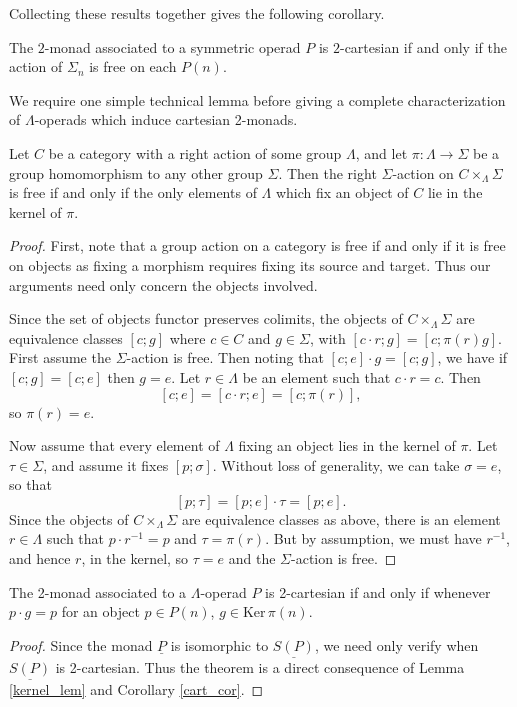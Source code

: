 \documentclass{amsbook} %
\numberwithin{section}{chapter}
\begin{document}
Collecting these results together gives the following corollary.

\begin{cor}\label{cart_cor}
The $2$-monad associated to a symmetric operad $P$ is $2$-cartesian if and only if the action of $\Sigma_n$ is free on each $P(n)$.
\end{cor}

We require one simple technical lemma before giving a complete characterization of $\Lambda$-operads which induce cartesian 2-monads.

\begin{lem}\label{kernel_lem}
Let $C$ be a category with a right action of some group $\Lambda$, and let $\pi: \Lambda \to \Sigma$ be a group homomorphism to any other group $\Sigma$.  Then the right $\Sigma$-action on $C \times_{\Lambda} \Sigma$ is free if and only if the only elements of $\Lambda$ which fix an object of $C$ lie in the kernel of $\pi$.
\end{lem}
\begin{proof}
First, note that a group action on a category is free if and only if it is free on objects as fixing a morphism requires fixing its source and target.  Thus our arguments need only concern the objects involved.

Since the set of objects functor preserves colimits, the objects of $C \times_{\Lambda} \Sigma$ are equivalence classes $[c;g]$ where $c \in C$ and $g \in \Sigma$, with $[c\cdot r;g] = [c; \pi(r)g]$.  First assume the $\Sigma$-action is free.  Then noting that $[c;e]\cdot g =[c;g]$, we have if $[c;g] = [c;e]$ then $g=e$.  Let $r \in \Lambda$ be an element such that $c\cdot r = c$.  Then
\[
[c;e] = [c\cdot r; e] = [c; \pi(r)],
\]
so $\pi(r) = e$.

Now assume that every element of $\Lambda$ fixing an object lies in the kernel of $\pi$.  Let $\tau \in \Sigma$, and assume it fixes $[p; \sigma]$.  Without loss of generality, we can take $\sigma = e$, so that
\[
[p; \tau] = [p;e]\cdot \tau = [p;e].
\]
Since the objects of $C \times_{\Lambda} \Sigma$ are equivalence classes as above, there is an element $r \in \Lambda$ such that $p\cdot r^{-1} = p$ and $\tau = \pi(r)$.  But by assumption, we must have $r^{-1}$, and hence $r$, in the kernel, so $\tau = e$ and the $\Sigma$-action is free.
\end{proof}

\begin{thm}\label{cart_thm}
The 2-monad associated to a $\Lambda$-operad $P$ is 2-cartesian if and only if whenever $p \cdot g = p$ for an object $p \in P(n)$, $g \in \textrm{Ker} \, \pi (n)$.
\end{thm}
\begin{proof}
Since the monad $\underline{P}$ is isomorphic to $\underline{S(P)}$, we need only verify when $\underline{S(P)}$ is 2-cartesian.  Thus the theorem is a direct consequence of Lemma \ref{kernel_lem} and Corollary \ref{cart_cor}.
\end{proof}
\end{document}
